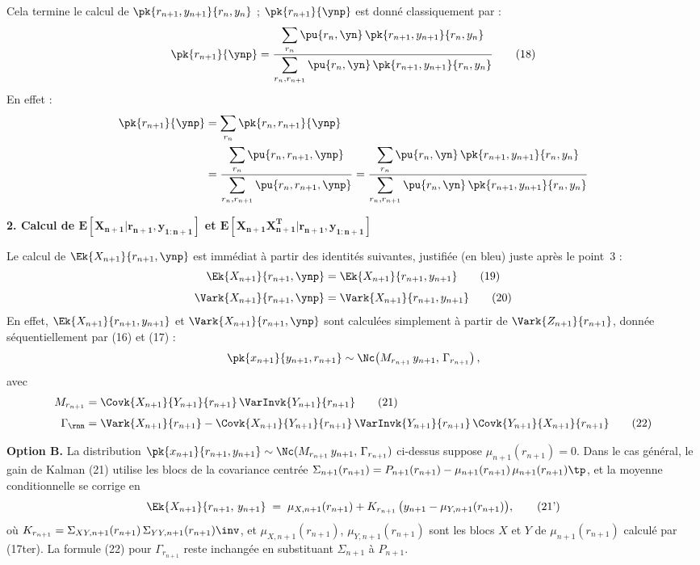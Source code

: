 \documentclass[12pt, a4paper]{article}
\begin{document}
Cela termine le calcul de $\pk{r_{n+1}, y_{n+1}}{r_n, y_n}$ ; $\pk{r_{n+1}}{\ynp}$ est
donné classiquement par :
\begin{equation}
  \pk{r_{n+1}}{\ynp}
  = \frac{\displaystyle\sum_{r_n} \pu{r_n, \yn}\,\pk{r_{n+1}, y_{n+1}}{r_n, y_n}}
         {\displaystyle\sum_{r_n, r_{n+1}} \pu{r_n, \yn}\,\pk{r_{n+1}, y_{n+1}}{r_n, y_n}}
  \tag{18}
\end{equation}
En effet :
\begin{align*}
  \pk{r_{n+1}}{\ynp}
  &= \sum_{r_n} \pk{r_n, r_{n+1}}{\ynp} \\
  &= \frac{\displaystyle\sum_{r_n} \pu{r_n, r_{n+1}, \ynp}}
          {\displaystyle\sum_{r_n, r_{n+1}} \pu{r_n, r_{n+1}, \ynp}}
   = \frac{\displaystyle\sum_{r_n} \pu{r_n, \yn}\,\pk{r_{n+1}, y_{n+1}}{r_n, y_n}}
          {\displaystyle\sum_{r_n, r_{n+1}} \pu{r_n, \yn}\,\pk{r_{n+1}, y_{n+1}}{r_n, y_n}}
\end{align*}

\bigskip
\noindent\textbf{2. Calcul de $\bm{E[X_{n+1}|r_{n+1}, y_{1:n+1}]}$ et
  $\bm{E[X_{n+1}X_{n+1}^T|r_{n+1}, y_{1:n+1}]}$}

\medskip
Le calcul de $\Ek{X_{n+1}}{r_{n+1}, \ynp}$ est immédiat à partir des identités suivantes,
justifiée (en bleu) juste après le point~3 :
\begin{align}
  \Ek{X_{n+1}}{r_{n+1}, \ynp} &= \Ek{X_{n+1}}{r_{n+1}, y_{n+1}} \tag{19} \\[4pt]
  \Vark{X_{n+1}}{r_{n+1}, \ynp} &= \Vark{X_{n+1}}{r_{n+1}, y_{n+1}} \tag{20}
\end{align}
En effet, $\Ek{X_{n+1}}{r_{n+1}, y_{n+1}}$ et $\Vark{X_{n+1}}{r_{n+1}, \ynp}$ sont
calculées simplement à partir de $\Vark{Z_{n+1}}{r_{n+1}}$, donnée séquentiellement par
(16) et (17) :
\[
  \pk{x_{n+1}}{y_{n+1}, r_{n+1}}
  \sim \Nc\!\left(M_{r_{n+1}}\,y_{n+1},\,\Gamma_{r_{n+1}}\right),
\]
avec
\begin{align}
  M_{r_{n+1}} &= \Covk{X_{n+1}}{Y_{n+1}}{r_{n+1}}\,\VarInvk{Y_{n+1}}{r_{n+1}}
    \tag{21} \\[4pt]
  \Gamma_{\rnn} &= \Vark{X_{n+1}}{r_{n+1}}
    - \Covk{X_{n+1}}{Y_{n+1}}{r_{n+1}}\,\VarInvk{Y_{n+1}}{r_{n+1}}\,\Covk{Y_{n+1}}{X_{n+1}}{r_{n+1}}
    \tag{22}
\end{align}

{\color{green!60!black}
\smallskip
\noindent\textbf{Option B.}
La distribution $\pk{x_{n+1}}{r_{n+1}, y_{n+1}} \sim \Nc(M_{r_{n+1}}\,y_{n+1},\,\Gamma_{r_{n+1}})$
ci-dessus suppose $\mu_{n+1}(r_{n+1}) = 0$.
Dans le cas général, le gain de Kalman (21) utilise les blocs de la covariance centrée
$\Sigma_{n+1}(r_{n+1}) = P_{n+1}(r_{n+1}) - \mu_{n+1}(r_{n+1})\,\mu_{n+1}(r_{n+1})\tp$,
et la moyenne conditionnelle se corrige en
\begin{equation}
  \Ek{X_{n+1}}{r_{n+1},\,y_{n+1}}
  \;=\; \mu_{X,n+1}(r_{n+1})
        + K_{r_{n+1}}\,\bigl(y_{n+1} - \mu_{Y,n+1}(r_{n+1})\bigr),
  \tag{21'}
\end{equation}
où $K_{r_{n+1}} = \Sigma_{XY,n+1}(r_{n+1})\,\Sigma_{YY,n+1}(r_{n+1})\inv$,
et $\mu_{X,n+1}(r_{n+1})$, $\mu_{Y,n+1}(r_{n+1})$ sont les blocs $X$ et $Y$
de $\mu_{n+1}(r_{n+1})$ calculé par (17ter).
La formule (22) pour $\Gamma_{r_{n+1}}$ reste inchangée en substituant $\Sigma_{n+1}$ à $P_{n+1}$.
}
\end{document}
